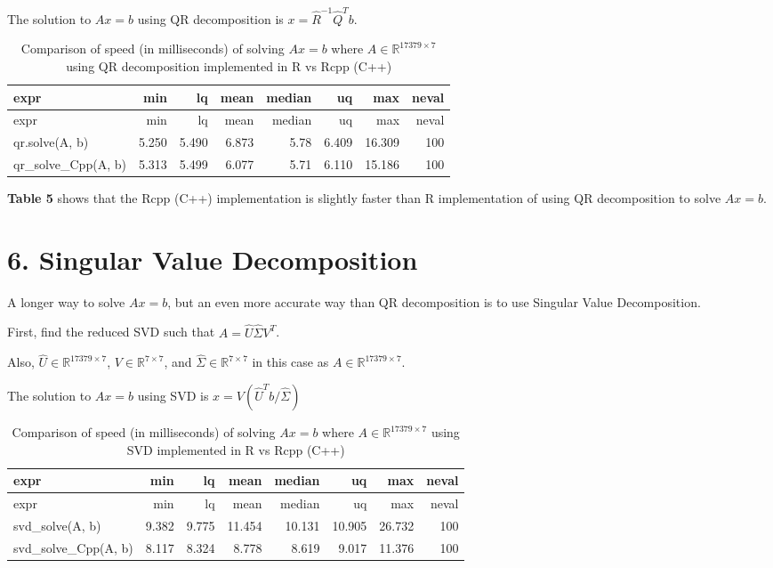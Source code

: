 \documentclass[
]{article}
\begin{document}
The solution to \(Ax = b\) using QR decomposition is
\(x = \hat{R}^{-1}\hat{Q}^{T}b\).

\begin{longtable}[]{@{}lrrrrrrr@{}}
\caption{Comparison of speed (in milliseconds) of solving \(Ax = b\)
where \(A \in \mathbb{R}^{17379 \times 7}\) using QR decomposition
implemented in R vs Rcpp (C++)}\tabularnewline
\toprule
expr & min & lq & mean & median & uq & max & neval\tabularnewline
\midrule
\endfirsthead
\toprule
expr & min & lq & mean & median & uq & max & neval\tabularnewline
\midrule
\endhead
qr.solve(A, b) & 5.250 & 5.490 & 6.873 & 5.78 & 6.409 & 16.309 &
100\tabularnewline
qr\_solve\_Cpp(A, b) & 5.313 & 5.499 & 6.077 & 5.71 & 6.110 & 15.186 &
100\tabularnewline
\bottomrule
\end{longtable}

\textbf{Table 5} shows that the Rcpp (C++) implementation is slightly
faster than R implementation of using QR decomposition to solve
\(Ax = b\).

\hypertarget{singular-value-decomposition}{%
\section{6. Singular Value
Decomposition}\label{singular-value-decomposition}}

A longer way to solve \(Ax = b\), but an even more accurate way than QR
decomposition is to use Singular Value Decomposition.

First, find the reduced SVD such that \(A = \hat{U}\hat{\Sigma}V^{T}\).

Also, \(\hat{U} \in \mathbb{R}^{17379 \times 7}\),
\(V \in \mathbb{R}^{7 \times 7}\), and
\(\hat{\Sigma} \in \mathbb{R}^{7 \times 7}\) in this case as
\(A \in \mathbb{R}^{17379 \times 7}\).

The solution to \(Ax = b\) using SVD is
\(x = V(\hat{U}^{T}b/\hat{\Sigma})\)

\begin{longtable}[]{@{}lrrrrrrr@{}}
\caption{Comparison of speed (in milliseconds) of solving \(Ax = b\)
where \(A \in \mathbb{R}^{17379 \times 7}\) using SVD implemented in R
vs Rcpp (C++)}\tabularnewline
\toprule
expr & min & lq & mean & median & uq & max & neval\tabularnewline
\midrule
\endfirsthead
\toprule
expr & min & lq & mean & median & uq & max & neval\tabularnewline
\midrule
\endhead
svd\_solve(A, b) & 9.382 & 9.775 & 11.454 & 10.131 & 10.905 & 26.732 &
100\tabularnewline
svd\_solve\_Cpp(A, b) & 8.117 & 8.324 & 8.778 & 8.619 & 9.017 & 11.376 &
100\tabularnewline
\bottomrule
\end{longtable}
\end{document}
